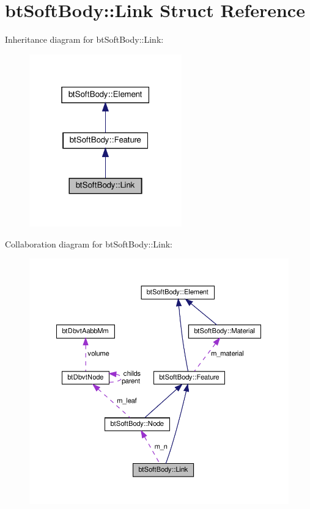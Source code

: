 \hypertarget{structbtSoftBody_1_1Link}{}\section{bt\+Soft\+Body\+:\+:Link Struct Reference}
\label{structbtSoftBody_1_1Link}


Inheritance diagram for bt\+Soft\+Body\+:\+:Link\+:
\nopagebreak
\begin{figure}[H]
\begin{center}
\leavevmode
\includegraphics[width=187pt]{structbtSoftBody_1_1Link__inherit__graph}
\end{center}
\end{figure}


Collaboration diagram for bt\+Soft\+Body\+:\+:Link\+:
\nopagebreak
\begin{figure}[H]
\begin{center}
\leavevmode
\includegraphics[width=350pt]{structbtSoftBody_1_1Link__coll__graph}
\end{center}
\end{figure}
